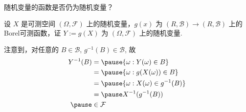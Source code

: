 \begin{frame}{随机变量的函数是否仍为随机变量？}
	\vspace{0.5cm}
	\begin{thm}
		设 $X$ 是可测空间 $(\Omega,\mathcal{F})$ 上的随机变量，$g (x)$ 为 $(R,\mathcal{B})\rightarrow (R,\mathcal{B})$ 上的Borel可测函数，证 $Y:=g (X)$ 为 $(\Omega,\mathcal{F})$ 上的随机变量.
	\end{thm}

	\vspace{0.3cm}
	\pause
	\zheng 注意到，对任意的 $B\in \mathcal{B}$, $g^{-1}(B)\in \mathcal{B}$, 故 \pause
	\begin{align*}
		Y^{-1}(B) & =\pause \{\omega:Y(\omega)\in B\}         \\
		          & =\pause \{\omega:g(X(\omega))\in B\}      \\
		          & =\pause \{\omega:X(\omega)\in g^{-1}(B)\} \\
		          & =\pause X^{-1}(g^{-1}(B))                 \\ \pause
		          & \in  \mathcal{F}
	\end{align*}

\end{frame}


